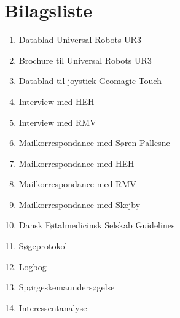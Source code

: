 \chapter{Bilagsliste}
\begin{enumerate}
\item Datablad Universal Robots UR3
\item Brochure til Universal Robots UR3
\item Datablad til joystick Geomagic Touch
\item Interview med HEH
\item Interview med RMV
\item Mailkorrespondance med Søren Pallesne
\item Mailkorrespondance med HEH
\item Mailkorrespondance med RMV
\item Mailkorrespondance med Skejby
\item Dansk Føtalmedicinsk Selskab Guidelines
\item Søgeprotokol
\item Logbog
\item Spørgeskemaundersøgelse
\item Interessentanalyse
\end{enumerate}

